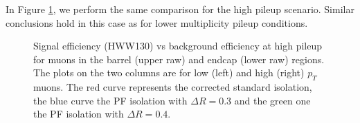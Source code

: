 \clearpage


In Figure \ref{fig:IsoPerformance_Muon_HighPU}, we perform the same comparison
for the high pileup scenario. Similar conclusions hold in this case 
as for lower multiplicity pileup conditions.


\begin{figure}[!htbp]
\begin{center}
\caption{Signal efficiency (HWW130) vs background efficiency at high pileup
for muons in the barrel (upper raw) and endcap (lower raw) regions. The plots on the two columns
are for low (left) and high (right) $p_T$ muons. 
The red curve represents the corrected standard isolation, the blue curve the PF isolation with $\Delta R=0.3$
and the green one the PF isolation with $\Delta R=0.4$.}
\label{fig:IsoPerformance_Muon_HighPU}
\end{center}
\end{figure}
